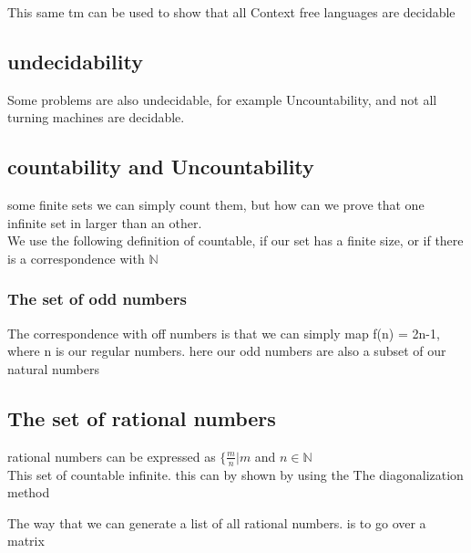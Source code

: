 \documentclass[a4paper,10pt,titlepage]{report}
\begin{document}
This same tm can be used to show that all Context free languages are decidable\

\subsection{undecidability}
Some problems are also undecidable, for example Uncountability, and not all turning machines are decidable.
\subsection{countability and Uncountability}
some finite sets we can simply count them, but how can we prove that one infinite set in larger than an other.\\
We use the following definition of countable, if our set has a finite size, or if there is a correspondence with $\mathbb{N}$\\

\subsubsection{The set of odd numbers}

The correspondence with off numbers is that we can simply map f(n) = 2n-1, where n is our regular numbers. here our odd numbers are also a subset of our natural numbers

\subsection{The set of rational numbers}

rational numbers can be expressed as $\{\frac{m}{n} | m $ and $ n \in \mathbb{N}$\\

This set of countable infinite. this can by shown by using the The diagonalization method

The way that we can generate a list of all rational numbers. is to go over a matrix 

\newcommand\tabnode[1]{\addtocounter{nodecount}{1} \tikz \node (\arabic{nodecount}) {#1};}
\end{document}
